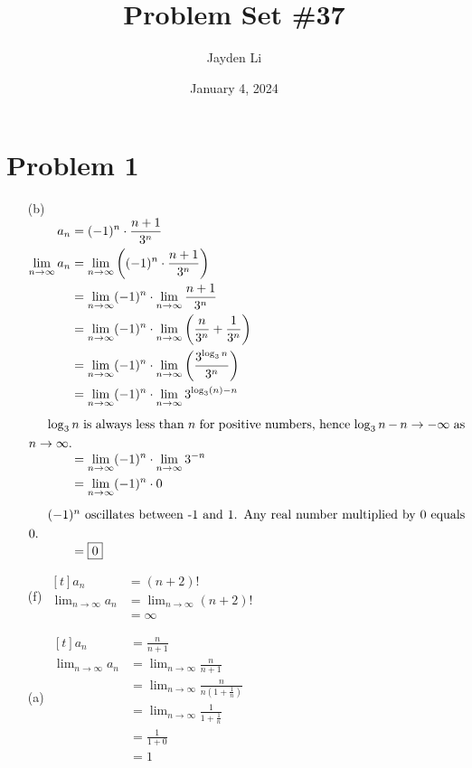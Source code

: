 \documentclass{article}
\title{Problem Set \#37}
\author{Jayden Li}
\date{January 4, 2024}
\newcommand{\alignedintertext}[1]{%
	\noalign{%
		\vskip\belowdisplayshortskip
		\vtop{\hsize=\linewidth#1\par
		\expandafter}%
		\expandafter\prevdepth\the\prevdepth
	}%
}
\begin{document}
\maketitle

\section*{Problem 1}
\begin{multicols}{2}
\begin{itemize}
\item[(b)]
$\begin{aligned}[t]
	a_n&=(-1)^n\cdot\frac{n+1}{3^n} \\
	\lim_{n\to\infty}a_n&=\lim_{n\to\infty}
		\left((-1)^n\cdot\frac{n+1}{3^n}\right) \\
	&=\lim_{n\to\infty}(-1)^n\cdot
		\lim_{n\to\infty}\frac{n+1}{3^n} \\
	&=\lim_{n\to\infty}(-1)^n\cdot\lim_{n\to\infty}
		\left(\frac{n}{3^n}+\frac{1}{3^n}\right) \\
	&=\lim_{n\to\infty}(-1)^n\cdot\lim_{n\to\infty}
		\left(\frac{3^{\log_3{n}}}{3^n}\right) \\
	&=\lim_{n\to\infty}(-1)^n\cdot\lim_{n\to\infty}
		3^{\log_3\left(n\right)-n} \\
	\alignedintertext{$\log_3{n}$ is always less than $n$ for
	positive numbers, hence $\log_3{n}-n\to-\infty$ as $n\to\infty$.}
	&=\lim_{n\to\infty}(-1)^n\cdot\lim_{n\to\infty}3^{-n} \\
	&=\lim_{n\to\infty}(-1)^n\cdot0 \\
	\alignedintertext{$(-1)^n$ oscillates between -1 and 1. Any real
	number multiplied by $0$ equals $0$.}
	&=\boxed{0}
\end{aligned}$

\item[(f)]
	$\begin{aligned}[t]
		a_n&=(n+2)! \\
		\lim_{n\to\infty}a_n&=\lim_{n\to\infty}(n+2)! \\
		&=\boxed{\infty}
	\end{aligned}$

\item[(a)]
	$\begin{aligned}[t]
		a_n&=\frac{n}{n+1} \\
		\lim_{n\to\infty}a_n&=\lim_{n\to\infty}\frac{n}{n+1} \\
		&=\lim_{n\to\infty}\frac{n}{n\left(1+\frac{1}{n}\right)} \\
		&=\lim_{n\to\infty}\frac{1}{1+\frac{1}{n}} \\
		&=\frac{1}{1+0} \\
		&=\boxed{1}
	\end{aligned}$


\end{itemize}
\end{multicols}
\end{document}
